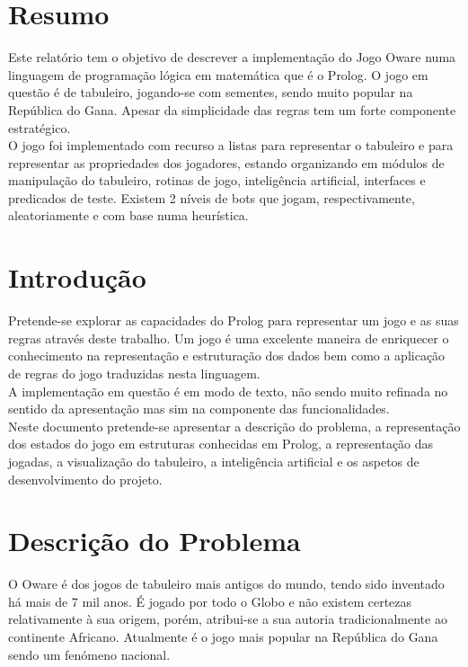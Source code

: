 \documentclass[15pt,a4paper]{article}
\begin{document}
\section*{Resumo}
Este relatório tem o objetivo de descrever a implementação do Jogo Oware numa linguagem de programação lógica em matemática que é o Prolog. O jogo em questão é de tabuleiro, jogando-se com sementes, sendo muito popular na República do Gana. Apesar da simplicidade das regras tem um forte componente estratégico.\\
O jogo foi implementado com recurso a listas para representar o tabuleiro e para representar as propriedades dos jogadores, estando organizando em módulos de manipulação do tabuleiro, rotinas de jogo, inteligência artificial, interfaces e predicados de teste. Existem 2 níveis de bots que jogam, respectivamente, aleatoriamente e com base numa heurística.



\section{Introdução}
Pretende-se explorar as capacidades do Prolog para representar um jogo e as suas regras através deste trabalho. Um jogo é uma excelente maneira de enriquecer o conhecimento na representação e estruturação dos dados bem como a aplicação de regras do jogo traduzidas nesta linguagem. \\
\indent A implementação em questão é em modo de texto, não sendo muito refinada no sentido da apresentação mas sim na componente das funcionalidades. \\
\indent Neste documento pretende-se apresentar a descrição do problema, a representação dos estados do jogo em estruturas conhecidas em Prolog, a representação das jogadas, a visualização do tabuleiro, a inteligência artificial e os aspetos de desenvolvimento do projeto.

\section{Descrição do Problema}
O Oware é dos jogos de tabuleiro mais antigos do mundo, tendo sido inventado há mais de 7 mil anos. É jogado por todo o Globo e não existem certezas relativamente à sua origem, porém, atribui-se a sua autoria tradicionalmente ao continente Africano. Atualmente é o jogo mais popular na República do Gana sendo um fenómeno nacional.
\end{document}
